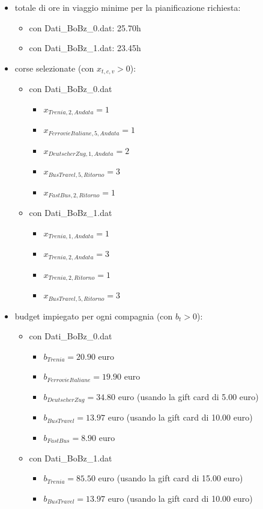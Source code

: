 \documentclass[main.tex]{subfiles}
\begin{document}
\begin{itemize}
    \item totale di ore in viaggio minime per la pianificazione richiesta:
    \begin{itemize}
        \item con Dati\_BoBz\_0.dat: 25.70h
        \item con Dati\_BoBz\_1.dat: 23.45h
    \end{itemize}
    \item corse selezionate (con $x_{t,c,v} > 0$):
    \begin{itemize}
        \item con Dati\_BoBz\_0.dat
        \begin{itemize}
            \item $x_{Trenia,2,Andata} = 1$
            \item $x_{FerrovieItaliane,5,Andata} = 1$
            \item $x_{DeutscherZug,1,Andata} = 2$
            \item $x_{BusTravel,5,Ritorno} = 3$
            \item $x_{FastBus,2,Ritorno} = 1$
        \end{itemize}
        \item con Dati\_BoBz\_1.dat
        \begin{itemize}
            \item $x_{Trenia,1,Andata} = 1$
            \item $x_{Trenia,2,Andata} = 3$
            \item $x_{Trenia,2,Ritorno} = 1$
            \item $x_{BusTravel,5,Ritorno} = 3$
        \end{itemize}
    \end{itemize}
    \item budget impiegato per ogni compagnia (con $b_t > 0$):
    \begin{itemize}
        \item con Dati\_BoBz\_0.dat
        \begin{itemize}
            \item $b_{Trenia} = 20.90$ euro
            \item $b_{FerrovieItaliane} = 19.90$ euro
            \item $b_{DeutscherZug} = 34.80$ euro (usando la gift card di 5.00 euro)
            \item $b_{BusTravel} = 13.97$ euro (usando la gift card di 10.00 euro)
            \item $b_{FastBus} = 8.90$ euro
        \end{itemize}
        \item con Dati\_BoBz\_1.dat
        \begin{itemize}
            \item $b_{Trenia} = 85.50$ euro (usando la gift card di 15.00 euro)
            \item $b_{BusTravel} = 13.97$ euro (usando la gift card di 10.00 euro)
        \end{itemize}
    \end{itemize}
\end{itemize}
\end{document}
